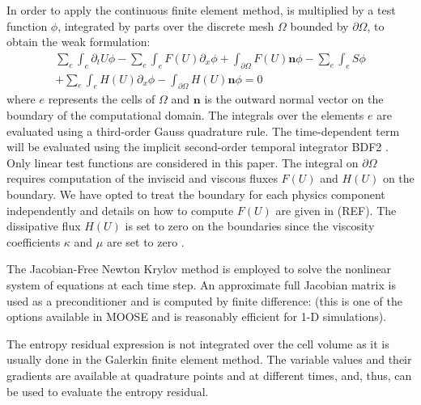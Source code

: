 \documentclass[review]{elsarticle}
\begin{document}
In order to apply the continuous finite element method,  is multiplied by a test function $\phi$, integrated by parts over the discrete mesh $\Omega$ bounded by $\partial \Omega$, to obtain the weak formulation:
\begin{multline}
\sum_e \int_{e} \partial_t U \phi - \sum_e \int_{e} F(U) \partial_x \phi + \int_{\partial \Omega} F(U) \mathbf{n} \phi - 
 \sum_e \int_{e} S \phi \\
 + \sum_e \int_{e} H(U) \partial_x \phi - \int_{\partial \Omega}H \left( U \right) \mathbf{n} \phi= 0
\end{multline}
where $e$ represents the cells of $\Omega$ and $\mathbf{n}$ is the outward normal vector on the boundary of the computational domain. 
The integrals over the elements $e$ are evaluated using a third-order Gauss quadrature rule. The time-dependent term will be evaluated using the implicit second-order temporal integrator BDF2 \cite{Leveque}. Only linear test functions are considered in this paper.
The integral on $\partial \Omega$ requires computation of the inviscid and viscous fluxes $F(U)$ and $H(U)$ on the boundary. We have opted to treat the boundary for each physics component independently and details on how to compute $F(U)$ are given in (REF). The dissipative flux $H(U)$ is set to zero on the boundaries since the viscosity coefficients $\kappa$ and $\mu$ are set to zero \cite{jlg1, jlg2, valentin}. 

The Jacobian-Free Newton Krylov method \cite{JFNK} is employed to solve the nonlinear system of equations at each time step.
An approximate full Jacobian matrix is used as a preconditioner and is computed by finite difference: (this is one of the options available in MOOSE and is reasonably efficient for 1-D simulations). 

\begin{remark}
The entropy residual expression is not integrated over the cell volume as it is usually done in the Galerkin finite element method. The variable values and their gradients are available at quadrature points and at different times, and, thus, can be used to evaluate the entropy residual. 
\end{remark}
%
\end{document}
